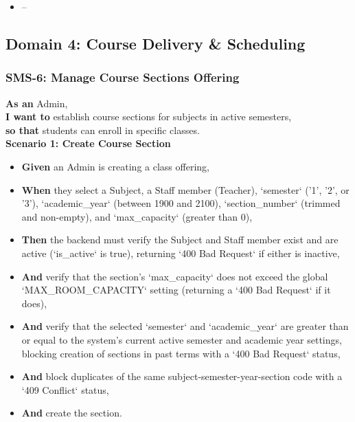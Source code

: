 \begin{itemize}
  \item --
\end{itemize}

\subsection{Domain 4: Course Delivery \& Scheduling}

\subsubsection{SMS-6: Manage Course Sections Offering}
\noindent \textbf{As an} Admin, \\
\noindent \textbf{I want to} establish course sections for subjects in active semesters, \\
\noindent \textbf{so that} students can enroll in specific classes. \\



\noindent\textbf{Scenario 1: Create Course Section}\\
\begin{itemize}
  \item \textbf{Given} an Admin is creating a class offering,
  \item \textbf{When} they select a Subject, a Staff member (Teacher), `semester` ('1', '2', or '3'), `academic\_year` (between 1900 and 2100), `section\_number` (trimmed and non-empty), and `max\_capacity` (greater than 0),
  \item \textbf{Then} the backend must verify the Subject and Staff member exist and are active (`is\_active` is true), returning `400 Bad Request` if either is inactive,
  \item \textbf{And} verify that the section's `max\_capacity` does not exceed the global `MAX\_ROOM\_CAPACITY` setting (returning a `400 Bad Request` if it does),
  \item \textbf{And} verify that the selected `semester` and `academic\_year` are greater than or equal to the system's current active semester and academic year settings, blocking creation of sections in past terms with a `400 Bad Request` status,
  \item \textbf{And} block duplicates of the same subject-semester-year-section code with a `409 Conflict` status,
  \item \textbf{And} create the section.
\end{itemize}



